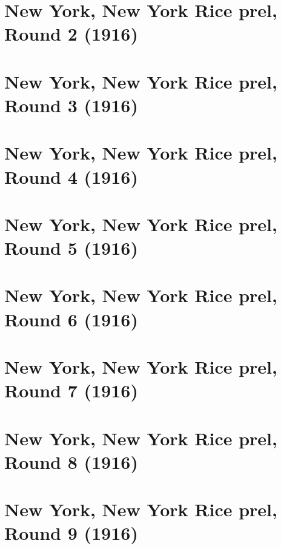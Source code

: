 \documentclass[11pt]{article}
\begin{document}
\clearpage

\section{New York, New York Rice prel, Round 2 (1916)}


\clearpage

\section{New York, New York Rice prel, Round 3 (1916)}


\clearpage

\section{New York, New York Rice prel, Round 4 (1916)}


\clearpage

\section{New York, New York Rice prel, Round 5 (1916)}


\clearpage

\section{New York, New York Rice prel, Round 6 (1916)}


\clearpage

\section{New York, New York Rice prel, Round 7 (1916)}


\clearpage

\section{New York, New York Rice prel, Round 8 (1916)}


\clearpage

\section{New York, New York Rice prel, Round 9 (1916)}

\end{document}
